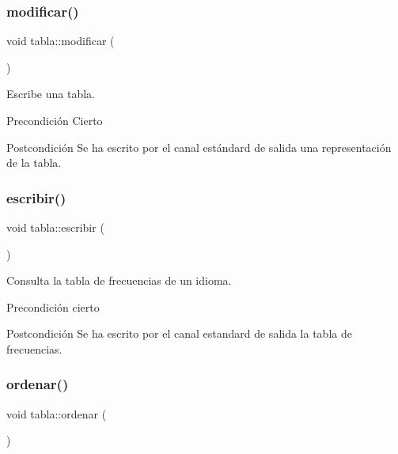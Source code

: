 \subsubsection{\texorpdfstring{modificar()}{modificar()}}
{\footnotesize\ttfamily void tabla\+::modificar (\begin{DoxyParamCaption}{ }\end{DoxyParamCaption})}



Escribe una tabla. 

\begin{DoxyPrecond}{Precondición}
Cierto 
\end{DoxyPrecond}
\begin{DoxyPostcond}{Postcondición}
Se ha escrito por el canal estándard de salida una representación de la tabla. 
\end{DoxyPostcond}
\mbox{\label{classtabla_ae0d9d7c8c80ef904a0c6cb0d25268b21}} 
\subsubsection{\texorpdfstring{escribir()}{escribir()}}
{\footnotesize\ttfamily void tabla\+::escribir (\begin{DoxyParamCaption}{ }\end{DoxyParamCaption})}



Consulta la tabla de frecuencias de un idioma. 

\begin{DoxyPrecond}{Precondición}
cierto 
\end{DoxyPrecond}
\begin{DoxyPostcond}{Postcondición}
Se ha escrito por el canal estandard de salida la tabla de frecuencias. 
\end{DoxyPostcond}
\mbox{\label{classtabla_a0c82642a3b06e17e3de850eedbe96d37}} 
\subsubsection{\texorpdfstring{ordenar()}{ordenar()}}
{\footnotesize\ttfamily void tabla\+::ordenar (\begin{DoxyParamCaption}{ }\end{DoxyParamCaption})}



